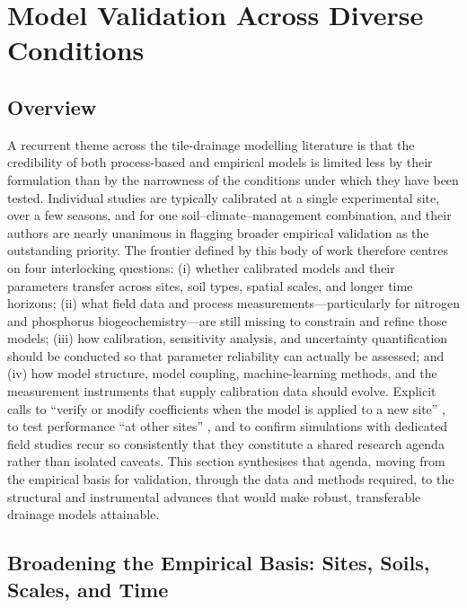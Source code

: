 \documentclass[11pt]{article}
\begin{document}
\section*{Model Validation Across Diverse Conditions}

\subsection{Overview}

A recurrent theme across the tile-drainage modelling literature is that the credibility of both process-based and empirical models is limited less by their formulation than by the narrowness of the conditions under which they have been tested. Individual studies are typically calibrated at a single experimental site, over a few seasons, and for one soil--climate--management combination, and their authors are nearly unanimous in flagging broader empirical validation as the outstanding priority. The frontier defined by this body of work therefore centres on four interlocking questions: (i) whether calibrated models and their parameters transfer across sites, soil types, spatial scales, and longer time horizons; (ii) what field data and process measurements---particularly for nitrogen and phosphorus biogeochemistry---are still missing to constrain and refine those models; (iii) how calibration, sensitivity analysis, and uncertainty quantification should be conducted so that parameter reliability can actually be assessed; and (iv) how model structure, model coupling, machine-learning methods, and the measurement instruments that supply calibration data should evolve. Explicit calls to ``verify or modify coefficients when the model is applied to a new site'' \parencite{Li2006}, to test performance ``at other sites'' \parencite{Qi2015}, and to confirm simulations with dedicated field studies \parencite{Shipitalo2016,Yousfi2014} recur so consistently that they constitute a shared research agenda rather than isolated caveats. This section synthesises that agenda, moving from the empirical basis for validation, through the data and methods required, to the structural and instrumental advances that would make robust, transferable drainage models attainable.

\subsection{Broadening the Empirical Basis: Sites, Soils, Scales, and Time}
\end{document}
